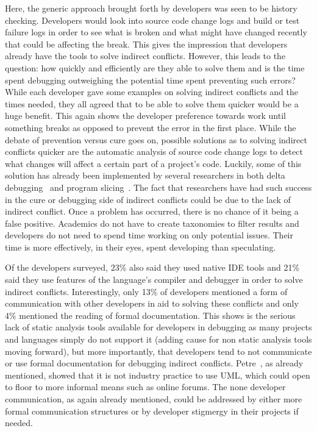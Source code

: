 \documentclass[conference]{IEEEtran}
\begin{document}
Here, the generic approach
brought forth by developers was seen to be history checking. Developers would look into source code change logs and build or test failure
logs in order to see what is broken and what might have changed recently that could be affecting the break. This gives the impression that
developers already have the tools to solve indirect conflicts. However, this leads to the question: how quickly and
efficiently are they able to solve them and is the time spent debugging outweighing the potential time spent preventing such errors?
While each developer gave some examples on solving indirect conflicts and the times needed, they all agreed that to be able to solve them
quicker would be a huge benefit. This again shows the developer preference towards work until something breaks as opposed to prevent the
error in the first place. While the debate of prevention versus cure goes on, possible solutions as to solving
indirect conflicts quicker are the automatic analysis of source code
change logs to detect what changes will affect a certain part of a project's code. Luckily, some of this solution has already been implemented
by several researchers in both delta debugging~\cite{Zeller:2002:ICC} and program slicing~\cite{Weiser:1982:PUS}. The fact that researchers
have had such success in the cure or debugging side of indirect conflicts could be due to the lack of indirect conflict. Once a problem has
occurred, there is no chance of it being a false positive. Academics do not have to create taxonomies to filter results and developers do
not need to spend time working on only potential issues. Their time is more effectively, in their eyes, spent developing than speculating. 

Of the developers surveyed, 23\% also said they used native IDE tools and 21\% said they use features of the language's compiler and debugger in order
to solve indirect conflicts. Interestingly, only 13\% of developers mentioned a form of communication with other developers in aid to
solving these conflicts and only 4\% mentioned the reading of formal documentation. This shows is the serious lack of static analysis tools
available for developers in debugging as many projects and languages simply do not support it (adding cause for non static analysis tools moving
forward), but more importantly, that developers tend to not communicate or use formal documentation for debugging indirect conflicts. Petre~\cite{Petre:2013:UP},
as already mentioned, showed that it is not industry practice to use UML, which could open to floor to more informal means such as online forums. The none
developer communication, as again already mentioned, could be addressed by either more formal communication structures or by developer stigmergy 
in their projects if needed.
\end{document}
